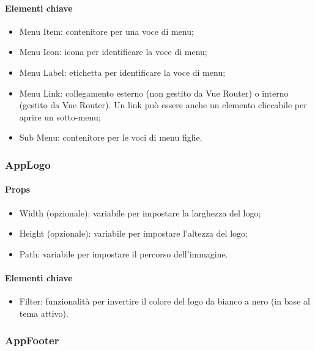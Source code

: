 \paragraph*{Elementi chiave}
\begin{itemize}
  \item Menu Item: contenitore per una voce di menu;
  \item Menu Icon: icona per identificare la voce di menu;
  \item Menu Label: etichetta per identificare la voce di menu;
  \item Menu Link: collegamento esterno (non gestito da Vue Router) o interno (gestito da Vue Router). Un link può essere anche un elemento cliccabile per aprire un sotto-menu;
  \item Sub Menu: contenitore per le voci di menu figlie.
\end{itemize}

\subsubsection{AppLogo}

\paragraph*{Props}
\begin{itemize}
  \item Width (opzionale): variabile per impostare la larghezza del logo;
  \item Height (opzionale): variabile per impostare l'altezza del logo;
  \item Path: variabile per impostare il percorso dell'immagine.
\end{itemize}

\paragraph*{Elementi chiave}
\begin{itemize}
  \item Filter: funzionalità per invertire il colore del logo da bianco a nero (in base al tema attivo).
\end{itemize}

\subsubsection{AppFooter}

